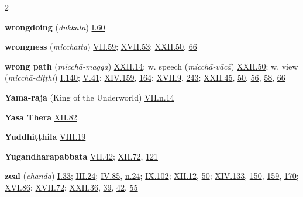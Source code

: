 \begin{multicols}{2}
\begin{vismHanging}
\par\textbf{wrongdoing} (\emph{dukkata}) \hyperlink{I.60}{I.60}{}
\par\textbf{wrongness} (\emph{micchatta}) \hyperlink{VII.59}{VII.59}{}; \hyperlink{XVII.53}{XVII.53}{}; \hyperlink{XXII.50}{XXII.50}{}, \hyperlink{XXII.66}{66}{}
\par\textbf{wrong path} (\emph{micchā-magga}) \hyperlink{XXII.14}{XXII.14}{}; w. speech (\emph{micchā-vācā}) \hyperlink{XXII.50}{XXII.50}{}; w. view (\emph{micchā-diṭṭhi}) \hyperlink{I.140}{I.140}{}; \hyperlink{V.41}{V.41}{}; \hyperlink{XIV.159}{XIV.159}{}, \hyperlink{XIV.164}{164}{}; \hyperlink{XVII.9}{XVII.9}{}, \hyperlink{XVII.243}{243}{}; \hyperlink{XXII.45}{XXII.45}{}, \hyperlink{XXII.50}{50}{}, \hyperlink{XXII.56}{56}{}, \hyperlink{XXII.58}{58}{}, \hyperlink{XXII.66}{66}{}
\par\textbf{Yama-rājā} (King of the Underworld) \hyperlink{VII.n14}{VII.n.14}{}
\par\textbf{Yasa Thera} \hyperlink{XII.82}{XII.82}{}
\par\textbf{Yuddhiṭṭhila} \hyperlink{VIII.19}{VIII.19}{}
\par\textbf{Yugandharapabbata} \hyperlink{VII.42}{VII.42}{}; \hyperlink{XII.72}{XII.72}{}, \hyperlink{XII.121}{121}{}
\par\textbf{zeal} (\emph{chanda}) \hyperlink{I.33}{I.33}{}; \hyperlink{III.24}{III.24}{}; \hyperlink{IV.85}{IV.85}{}, \hyperlink{IV.n24}{n.24}{}; \hyperlink{IX.102}{IX.102}{}; \hyperlink{XII.12}{XII.12}{}, \hyperlink{XII.50}{50}{}; \hyperlink{XIV.133}{XIV.133}{}, \hyperlink{XIV.150}{150}{}, \hyperlink{XIV.159}{159}{}, \hyperlink{XIV.170}{170}{}; \hyperlink{XVI.86}{XVI.86}{}; \hyperlink{XVII.72}{XVII.72}{}; \hyperlink{XXII.36}{XXII.36}{}, \hyperlink{XXII.39}{39}{}, \hyperlink{XXII.42}{42}{}, \hyperlink{XXII.55}{55}{}
\end{vismHanging}\end{multicols}